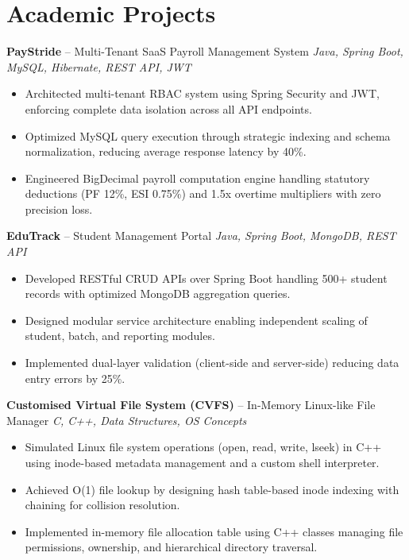 \documentclass[10.5pt,a4paper]{article}
\begin{document}
\section{Academic Projects}
\textbf{PayStride} -- Multi-Tenant SaaS Payroll Management System \hfill \textit{Java, Spring Boot, MySQL, Hibernate, REST API, JWT}
\begin{itemize}
  \item Architected multi-tenant RBAC system using Spring Security and JWT, enforcing complete data isolation across all API endpoints.
  \item Optimized MySQL query execution through strategic indexing and schema normalization, reducing average response latency by 40\%.
  \item Engineered BigDecimal payroll computation engine handling statutory deductions (PF 12\%, ESI 0.75\%) and 1.5x overtime multipliers with zero precision loss.
\end{itemize}
\vspace{2pt}
\textbf{EduTrack} -- Student Management Portal \hfill \textit{Java, Spring Boot, MongoDB, REST API}
\begin{itemize}
  \item Developed RESTful CRUD APIs over Spring Boot handling 500+ student records with optimized MongoDB aggregation queries.
  \item Designed modular service architecture enabling independent scaling of student, batch, and reporting modules.
  \item Implemented dual-layer validation (client-side and server-side) reducing data entry errors by 25\%.
\end{itemize}
\vspace{2pt}
\textbf{Customised Virtual File System (CVFS)} -- In-Memory Linux-like File Manager \hfill \textit{C, C++, Data Structures, OS Concepts}
\begin{itemize}
  \item Simulated Linux file system operations (open, read, write, lseek) in C++ using inode-based metadata management and a custom shell interpreter.
  \item Achieved O(1) file lookup by designing hash table-based inode indexing with chaining for collision resolution.
  \item Implemented in-memory file allocation table using C++ classes managing file permissions, ownership, and hierarchical directory traversal.
\end{itemize}
\end{document}
